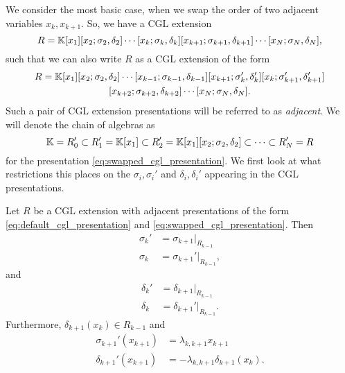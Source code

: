 \medskip

We consider the most basic case, when we swap the order of two adjacent variables $x_k,
	x_{k+1}$. So, we have a CGL extension
\begin{equation}\label{eq:default_cgl_presentation}
	R = \mathbb{K}[x_1][x_2; \sigma_2, \delta_2]\cdots[x_k; \sigma_k, \delta_k][x_{k+1};\sigma_{k+1}, \delta_{k+1}]\cdots[x_N; \sigma_N, \delta_N],
\end{equation}
%
such that we can also write $R$ as a CGL extension of the form
\begin{multline}\label{eq:swapped_cgl_presentation}
	R = \mathbb{K}[x_1][x_2; \sigma_2, \delta_2]\cdots[x_{k-1}; \sigma_{k-1}, \delta_{k-1}][x_{k+1}; \sigma_k', \delta_k'][x_k;\sigma_{k+1}', \delta_{k+1}']\\
	[x_{k+2}; \sigma_{k+2}, \delta_{k+2}]\cdots[x_N; \sigma_N, \delta_N].
\end{multline}
%
Such a pair of CGL extension presentations will be referred to as
\emph{adjacent}. We will denote the chain of algebras as
\begin{equation*}
	\mathbb{K} = R'_0 \subset R'_1  = \mathbb{K}[x_1] \subset R'_2 = \mathbb{K}[x_1][x_2; \sigma_2, \delta_2] \subset \cdots \subset R'_N = R
\end{equation*}
%
for the presentation \eqref{eq:swapped_cgl_presentation}. We first look at what
restrictions this places on the $\sigma_i, \sigma_i '$ and $\delta_i,\delta_i'$
appearing in the CGL presentations.
\begin{lemma}\label{lem:swapped_cgl_sigma_delta}
	Let $R$ be a CGL extension with adjacent presentations of the form \eqref{eq:default_cgl_presentation} and \eqref{eq:swapped_cgl_presentation}. Then
	\begin{equation}\label{eq:sigma_prime}
		\begin{aligned}
			\sigma_k ' & = \sigma_{k+1}|_{R_{k-1}}    \\
			\sigma_k   & = \sigma_{k+1}' |_{R_{k-1}},
		\end{aligned}
	\end{equation}
	and
	\begin{equation}\label{eq:delta_prime}
		\begin{aligned}
			\delta_k ' & = \delta_{k+1}|_{R_{k-1}}    \\
			\delta_k   & = \delta_{k+1}' |_{R_{k-1}}.
		\end{aligned}
	\end{equation}
	Furthermore, $\delta_{k+1}(x_k) \in R_{k-1}$ and
	\begin{equation}\label{eq:sigma_delta_prime_x_k_1}
		\begin{aligned}
			\sigma_{k+1}'(x_{k+1}) & = \lambda_{k, k+1} x_{k+1}             \\
			\delta_{k+1}'(x_{k+1}) & = -\lambda_{k, k+1} \delta_{k+1}(x_k).
		\end{aligned}
	\end{equation}
\end{lemma}
